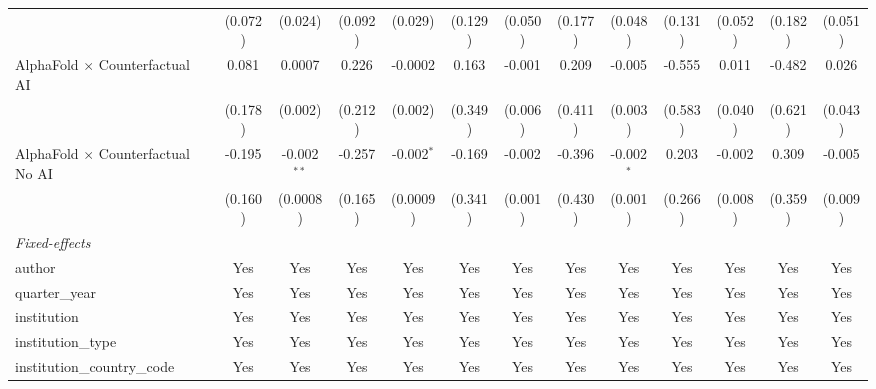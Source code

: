 \begin{tabular}{lcccccccccccc}
                                            & (0.072)       & (0.024)       & (0.092)       & (0.029)      & (0.129)      & (0.050)      & (0.177)      & (0.048)       & (0.131)      & (0.052) & (0.182) & (0.051)\\   
   AlphaFold $\times$ Counterfactual AI     & 0.081         & 0.0007        & 0.226         & -0.0002      & 0.163        & -0.001       & 0.209        & -0.005        & -0.555       & 0.011   & -0.482  & 0.026\\   
                                            & (0.178)       & (0.002)       & (0.212)       & (0.002)      & (0.349)      & (0.006)      & (0.411)      & (0.003)       & (0.583)      & (0.040) & (0.621) & (0.043)\\   
   AlphaFold $\times$ Counterfactual No AI  & -0.195        & -0.002$^{**}$ & -0.257        & -0.002$^{*}$ & -0.169       & -0.002       & -0.396       & -0.002$^{*}$  & 0.203        & -0.002  & 0.309   & -0.005\\   
                                            & (0.160)       & (0.0008)      & (0.165)       & (0.0009)     & (0.341)      & (0.001)      & (0.430)      & (0.001)       & (0.266)      & (0.008) & (0.359) & (0.009)\\   
   \midrule
   \emph{Fixed-effects}\\
   author                                   & Yes           & Yes           & Yes           & Yes          & Yes          & Yes          & Yes          & Yes           & Yes          & Yes     & Yes     & Yes\\  
   quarter\_year                            & Yes           & Yes           & Yes           & Yes          & Yes          & Yes          & Yes          & Yes           & Yes          & Yes     & Yes     & Yes\\  
   institution                              & Yes           & Yes           & Yes           & Yes          & Yes          & Yes          & Yes          & Yes           & Yes          & Yes     & Yes     & Yes\\  
   institution\_type                        & Yes           & Yes           & Yes           & Yes          & Yes          & Yes          & Yes          & Yes           & Yes          & Yes     & Yes     & Yes\\  
   institution\_country\_code               & Yes           & Yes           & Yes           & Yes          & Yes          & Yes          & Yes          & Yes           & Yes          & Yes     & Yes     & Yes\\  

\end{tabular}

